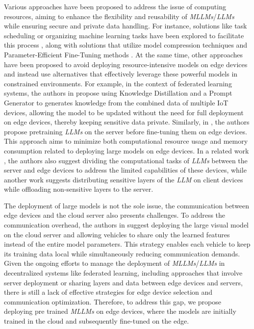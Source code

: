 Various approaches have been proposed to address the issue of computing resources, aiming to enhance the flexibility and reusability of \textit{MLLMs}/\textit{LLMs} while ensuring secure and private data handling. For instance, solutions like task scheduling or organizing machine learning tasks have been explored to facilitate this process \cite{tang2023fusionai}, along with solutions that utilize model compression techniques and Parameter-Efficient Fine-Tuning methods \cite{dong2024fine,jiang2024low,liu2023differentially,kim2023efficient,wu2024fedbiot,kuang2024federatedscope}.
At the same time, other approaches have been proposed to avoid deploying resource-intensive models on edge devices and instead use alternatives that effectively leverage these powerful models in constrained environments. For example, in the context of federated learning systems, the authors in \cite{atapour2024leveraging} propose using Knowledge Distillation and a Prompt Generator to generates knowledge from the combined data of multiple IoT devices, allowing the model to be updated without the need for full deployment on edge devices, thereby keeping sensitive data private. Similarly, in \cite{zhang2024mllm}, the authors propose pretraining \textit{LLMs} on the server before fine-tuning them on edge devices. This approach aims to minimize both computational resource usage and memory consumption related to deploying large models on edge devices. In a related work \cite{mudvari2024splitllm}, the authors also suggest dividing the computational tasks of \textit{LLMs} between the server and edge devices to address the limited capabilities of these devices, while another work \cite{zhao2024llm} suggests distributing sensitive layers of the \textit{LLM} on client devices while offloading non-sensitive layers to the server.

The deployment of large models is not the sole issue, the communication between edge devices and the cloud server also presents challenges. To address the communication overhead, the authors in \cite{kou2024pfedlvm} suggest deploying the large visual model on the cloud server and allowing vehicles to share only the learned features instead of the entire model parameters. This strategy enables each vehicle to keep its training data local while simultaneously reducing communication demands.
Given the ongoing efforts to manage the deployment of \textit{MLLMs}/\textit{LLMs} in decentralized systems like federated learning, including approaches that involve server deployment or sharing layers and data between edge devices and servers, there is still a lack of effective strategies for edge device selection and communication optimization. Therefore, to address this gap, we propose deploying pre trained \textit{MLLMs} on edge devices, where the models are initially trained in the cloud and subsequently fine-tuned on the edge. 

